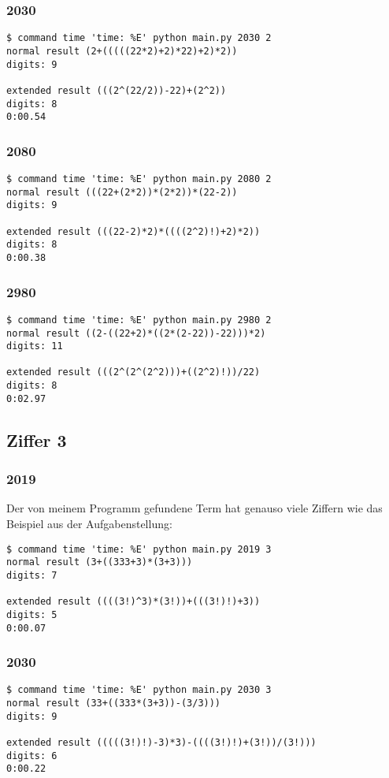 \subsubsection{2030}
\begin{lstlisting}
$ command time 'time: %E' python main.py 2030 2
normal result (2+(((((22*2)+2)*22)+2)*2))
digits: 9

extended result (((2^(22/2))-22)+(2^2))
digits: 8
0:00.54
\end{lstlisting}
\subsubsection{2080}
\begin{lstlisting}
$ command time 'time: %E' python main.py 2080 2
normal result (((22+(2*2))*(2*2))*(22-2))
digits: 9

extended result (((22-2)*2)*((((2^2)!)+2)*2))
digits: 8
0:00.38
\end{lstlisting}
\subsubsection{2980}
\begin{lstlisting}
$ command time 'time: %E' python main.py 2980 2
normal result ((2-((22+2)*((2*(2-22))-22)))*2)
digits: 11

extended result (((2^(2^(2^2)))+((2^2)!))/22)
digits: 8
0:02.97
\end{lstlisting}
\subsection{Ziffer 3}
\subsubsection{2019}
Der von meinem Programm gefundene Term hat genauso viele Ziffern wie das Beispiel aus der Aufgabenstellung:
\begin{lstlisting}
$ command time 'time: %E' python main.py 2019 3
normal result (3+((333+3)*(3+3)))
digits: 7

extended result ((((3!)^3)*(3!))+(((3!)!)+3))
digits: 5
0:00.07
\end{lstlisting}
\subsubsection{2030}
\begin{lstlisting}
$ command time 'time: %E' python main.py 2030 3
normal result (33+((333*(3+3))-(3/3)))
digits: 9

extended result (((((3!)!)-3)*3)-((((3!)!)+(3!))/(3!)))
digits: 6
0:00.22
\end{lstlisting}
